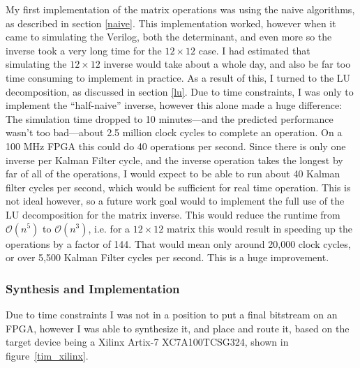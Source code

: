 \documentclass[12pt]{article}
\begin{document}
My first implementation of the matrix operations was using the naive algorithms, as described in section \ref{naive}. This implementation worked, however when it came to simulating the Verilog, both the determinant, and even more so the inverse took a very long time for the $12 \times 12$ case. I had estimated that simulating the $12 \times 12$ inverse would take about a whole day, and also be far too time consuming to implement in practice. As a result of this, I turned to the LU decomposition, as discussed in section \ref{lu}. Due to time constraints, I was only to implement the ``half-naive'' inverse, however this alone made a huge difference: The simulation time dropped to 10 minutes---and the predicted performance wasn't too bad---about 2.5 million clock cycles to complete an operation. On a 100 MHz FPGA this could do 40 operations per second. Since there is only one inverse per Kalman Filter cycle, and the inverse operation takes the longest by far of all of the operations, I would expect to be able to run about 40 Kalman filter cycles per second, which would be sufficient for real time operation. This is not ideal however, so a future work goal would to implement the full use of the LU decomposition for the matrix inverse. This would reduce the runtime from $\mathcal{O}(n^5)$ to $\mathcal{O}(n^3)$, i.e. for a $12 \times 12$ matrix this would result in speeding up the operations by a factor of 144. That would mean only around 20,000 clock cycles, or over 5,500 Kalman Filter cycles per second. This is a huge improvement.

\subsubsection{Synthesis and Implementation}

Due to time constraints I was not in a position to put a final bitstream on an FPGA, however I was able to synthesize it, and place and route it, based on the target device being a Xilinx Artix-7 XC7A100TCSG324, shown in figure~\ref{tim_xilinx}.
\end{document}
